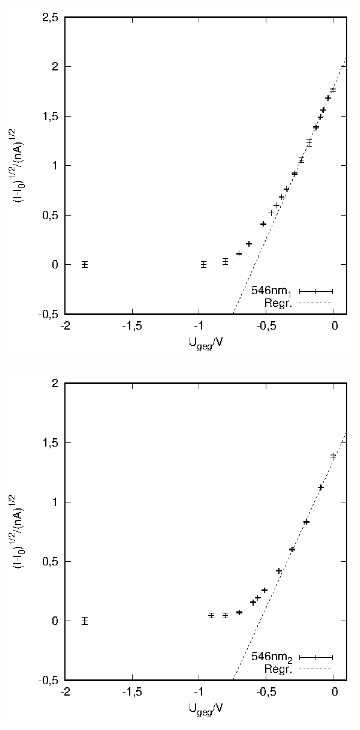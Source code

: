 \begin{figure}[hbt]
\begin{subfigure}[h]{0.5\textwidth}
  \end{subfigure}
  \begin{subfigure}[h]{0.5\textwidth}
    \centering
    \includegraphics{data/Messung_photoeffekt/546nm_1.eps}
  \end{subfigure}%
  \begin{subfigure}[h]{0.5\textwidth}
    \centering
    \includegraphics{data/Messung_photoeffekt/546nm_2.eps}

\end{subfigure}
\end{figure}
